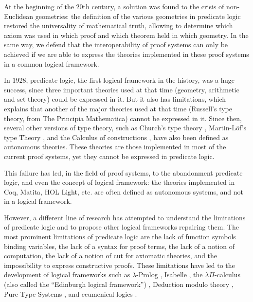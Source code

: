At the beginning of the 20th century, a solution was found to the
crisis of non-Euclidean geometries: the definition of the various
geometries in predicate logic \cite{HilbertAckermann} restored the
universality of mathematical truth, allowing to determine which axiom
was used in which proof and which theorem held in which geometry.
In the same way, we defend that the interoperability of
proof systems can only be achieved if we are able to express the
theories implemented in these proof systems in a common logical
framework.

In 1928, predicate logic, the first logical framework in the history,
was a huge success, since three important theories used at that time
(geometry, arithmetic and set theory) could be expressed in it. But it
also has limitations, which explains that another of the major
theories used at that time (Russell's type theory, from The Principia
Mathematica) cannot be expressed in it. Since then, several other
versions of type theory, such as Church's type theory \cite{Church40},
Martin-L\"of's type Theory \cite{Martin-Lof84}, and the Calculus of
constructions \cite{CoquandHuet88}, have also been defined as
autonomous theories. These theories are those implemented in most
of the current proof systems, yet they cannot be expressed in
predicate logic.

This failure has led, in the field of proof systems, to the
abandonment predicate logic, and even the concept of logical
framework: the theories implemented in {\sc Coq}, {\sc Matita}, {\sc
  HOL Light}, etc. are often defined as autonomous systems, and not in
a logical framework.

However, a different line of research has attempted to understand the
limitations of predicate logic and to propose other logical frameworks
repairing them. The most prominent limitations of predicate logic are
the lack of function symbols binding variables, the lack of a syntax
for proof terms, the lack of a notion of computation, the lack of a
notion of cut for axiomatic theories, and the impossibility to express
constructive proofs. These limitations have led to the development of
logical frameworks such as $\lambda$-Prolog \cite{NadathurMiller88,
  MillerNadathur12}, Isabelle \cite{Paulson90}, the $\lambda
\Pi$-calculus (also called the ``Edinburgh logical framework'')
\cite{HarperHonsellPlotkin91}, Deduction modulo theory
\cite{DowekHardinKirchner03, DowekWerner03}, Pure Type Systems
\cite{Berardi88,Terlouw89}, and ecumenical logics
\cite{Prawitz15,Dowek15,PereiraRodriguez17}.

